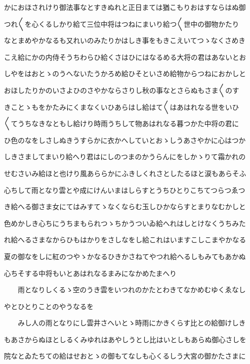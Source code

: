 \documentclass[a4paper,11pt,landscape]{ltjtarticle}
\begin{document}
\par\medskip
かにおほされけり御法事なとすきぬれと正日まては猶こもりおはすならはぬ御
\par\medskip
つれ〱を心くるしかり給て三位中将はつねにまいり給つ〱世中の御物かたり
\par\medskip
なとまめやかなるも又れいのみたりかはしき事をもきこえいてつゝなくさめき
\par\medskip
こえ給にかの内侍そうちわらひ給くさはひにはなるめる大将の君はあないとお
\par\medskip
しやをはおとゝのうへないたうかろめ給ひそといさめ給物からつねにおかしと
\par\medskip
おほしたりかのいさよひのさやかならさりし秋の事なとさらぬもさま〱のす
\par\medskip
きことゝもをかたみにくまなくいひあらはし給はて〱はあはれなる世をいひ
\par\medskip
〱てうちなきなともし給けり時雨うちして物あはれなる暮つかた中将の君に
\par\medskip
ひ色のなをしさしぬきうすらかに衣かへしていとおゝしうあさやかに心はつか
\par\medskip
しきさましてまいり給へり君はにしのつまのかうらんにをしかゝりて霜かれの
\par\medskip
せむさいみ給ほと也けり風あららかにふきしくれさとしたるほと涙もあらそふ
\par\medskip
心ちして雨となり雲とや成にけんいまはしらすとうちひとりこちてつらつゑつ
\par\medskip
き給へる御さま女にてはみすてゝなくならむ玉しひかならすとまりなむかしと
\par\medskip
色めかしき心ちにうちまもられつゝちかうついゐ給へれはしとけなくうちみた
\par\medskip
れ給へるさまなからひもはかりをさしなをし給これはいますこしこまやかなる
\par\medskip
夏の御なをしに紅のつやゝかなるひきかさねてやつれ給へるしもみてもあかぬ
\par\medskip
心ちそする中将もいとあはれなるまみになかめたまへり
\par\medskip
　　雨となりしくるゝ空のうき雲をいつれのかたとわきてなかめむゆくゑなし
\par\medskip
やとひとりことのやうなるを
\par\medskip
　　みし人の雨となりにし雲井さへいとゝ時雨にかきくらす比との給御けしき
\par\medskip
もあさからぬほとしるくみゆれはあやしうとし比はいとしもあらぬ御心さしを
\par\medskip
院なとゐたちての給はせおとゝの御もてなしも心くるしう大宮の御かたさまに
\end{document}
